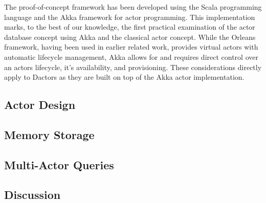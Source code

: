 The proof-of-concept framework has been developed using the Scala programming language and the Akka framework for actor programming.
This implementation marks, to the best of our knowledge, the first practical examination of the actor database concept using Akka and the classical actor concept.
While the Orleans framework, having been used in earlier related work, provides virtual actors with automatic lifecycle management, Akka allows for and requires direct control over an actors lifecycle, it's availability, and provisioning.
These considerations directly apply to Dactors as they are built on top of the Akka actor implementation.

\subsection{Actor Design}

\subsection{Memory Storage}

\subsection{Multi-Actor Queries}


\subsection{Discussion}
